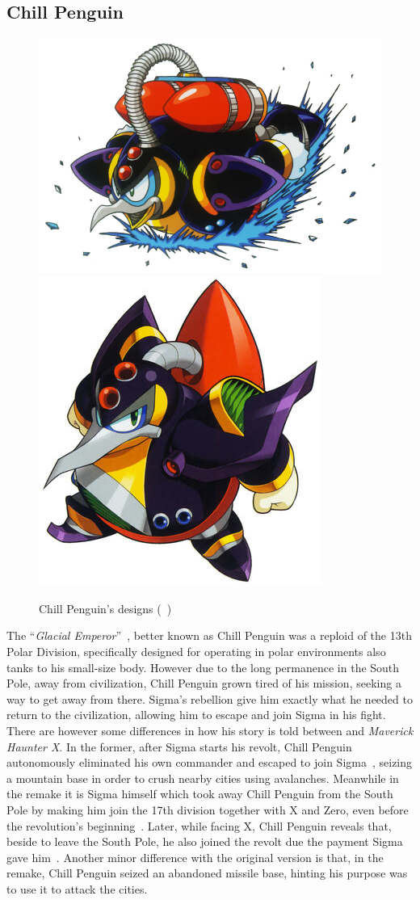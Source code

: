\subsection{Chill Penguin}\label{boss:Chill_Penguin}
\begin{figure}[htp]
	\centering
	\includegraphics[width=0.5\linewidth]{figures/X1/Chill_penguin/Chill_Penguin.jpg}
	\includegraphics[width=0.4\linewidth]{figures/X1/Chill_penguin/MHXChillPenguin.jpg}
	\caption{Chill Penguin's designs (~\cite{book:MMX_Complete_art})}
\end{figure}

The ``\textit{Glacial Emperor}''~\cite{book:MMX_Complete_art}, better known as Chill Penguin was a reploid of the 13th Polar Division, specifically designed for operating in polar environments also tanks to his small-size body. However due to the long permanence in the South Pole, away from civilization, Chill Penguin grown tired of his mission, seeking a way to get away from there. Sigma's rebellion give him exactly what he needed to return to the civilization, allowing him to escape and join Sigma in his fight. There are however some differences in how his story is told between \x and \textit{Maverick Haunter X}. In the former, after Sigma starts his revolt, Chill Penguin autonomously eliminated his own commander and escaped to join Sigma~\cite{Xcoll1:Manual_X1}, seizing a mountain base in order to crush nearby cities using avalanches. Meanwhile in the remake it is Sigma himself which took away Chill Penguin from the South Pole by making him join the 17th division together with X and Zero, even before the revolution's beginning~\cite{MHX:manual}. Later, while facing X, Chill Penguin reveals that, beside to leave the South Pole, he also joined the revolt due the payment Sigma gave him~\cite{wiki:MMX_script}. Another minor difference with the original version is that, in the remake, Chill Penguin seized an abandoned missile base, hinting his purpose was to use it to attack the cities. 

